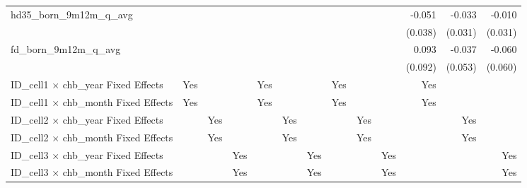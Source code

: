 \begin{tabular}{lrrrrrrrrrrrr}
hd35\_born\_9m12m\_q\_avg                   &              &              &              &              &              &              &              &              &              &       -0.051 &       -0.033 &       -0.010 \\ 
                                            &              &              &              &              &              &              &              &              &              &      (0.038) &      (0.031) &      (0.031) \\ 
fd\_born\_9m12m\_q\_avg                     &              &              &              &              &              &              &              &              &              &        0.093 &       -0.037 &       -0.060 \\ 
                                            &              &              &              &              &              &              &              &              &              &      (0.092) &      (0.053) &      (0.060) \\ 
\midrule
ID\_cell1 $\times$ chb\_year Fixed Effects  &          Yes &              &              &          Yes &              &              &          Yes &              &              &          Yes &              &              \\ 
ID\_cell1 $\times$ chb\_month Fixed Effects &          Yes &              &              &          Yes &              &              &          Yes &              &              &          Yes &              &              \\ 
ID\_cell2 $\times$ chb\_year Fixed Effects  &              &          Yes &              &              &          Yes &              &              &          Yes &              &              &          Yes &              \\ 
ID\_cell2 $\times$ chb\_month Fixed Effects &              &          Yes &              &              &          Yes &              &              &          Yes &              &              &          Yes &              \\ 
ID\_cell3 $\times$ chb\_year Fixed Effects  &              &              &          Yes &              &              &          Yes &              &              &          Yes &              &              &          Yes \\ 
ID\_cell3 $\times$ chb\_month Fixed Effects &              &              &          Yes &              &              &          Yes &              &              &          Yes &              &              &          Yes \\ 

\end{tabular}
